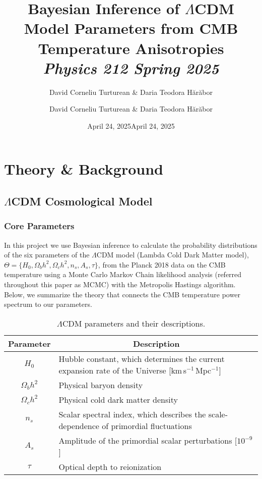 \documentclass[11pt]{article}
\author{David Corneliu Turturean \& Daria Teodora Hărăbor}
\date{April 24, 2025}
\title{%
  \textrm{Bayesian Inference of $\Lambda$CDM Model Parameters from CMB Temperature Anisotropies}\\[1ex]
  {\large\itshape Physics 212 Spring 2025}%
}
\author{David Corneliu Turturean \& Daria Teodora Hărăbor}
\date{April 24, 2025}
\theoremstyle{definition}
\begin{document}
\maketitle

\tableofcontents

\newpage

\section{Theory \& Background}
\label{sec:theory}

\subsection{$\Lambda$CDM Cosmological Model}

\subsubsection{Core Parameters}
In this project we use Bayesian inference to calculate the probability distributions of the six parameters of the \(\Lambda\)CDM model (Lambda Cold Dark Matter model),
\(\Theta=\{H_0,\Omega_b h^2,\Omega_c h^2,n_s,A_s,\tau\}\), from the Planck 2018 data \cite{planck2018params} on the CMB temperature using a Monte Carlo Markov Chain likelihood analysis (referred throughout this paper as MCMC) with the Metropolis Hastings algorithm. Below, we summarize the theory that connects the CMB temperature power spectrum to our parameters.

\begin{table}[h!]
  \centering
  \small
  \caption{$\Lambda$CDM parameters and their descriptions.}
  \label{tab:params_short}
  \begin{tabular}{c l}
    \toprule
    \multicolumn{1}{c}{\textbf{Parameter}} & 
    \multicolumn{1}{c}{\textbf{Description}} \\
    \midrule
    $H_0$           & Hubble constant, which determines the current expansion rate of the Universe [km\,s$^{-1}$\,Mpc$^{-1}$] \\
    $\Omega_bh^2$   & Physical baryon density                                                                             \\
    $\Omega_ch^2$   & Physical cold dark matter density                                                                   \\
    $n_s$           & Scalar spectral index, which describes the scale-dependence of primordial fluctuations               \\
    $A_s$           & Amplitude of the primordial scalar perturbations [$10^{-9}$]                                        \\
    $\tau$          & Optical depth to reionization                                                                       \\
    \bottomrule
  \end{tabular}
\end{table}
\end{document}
